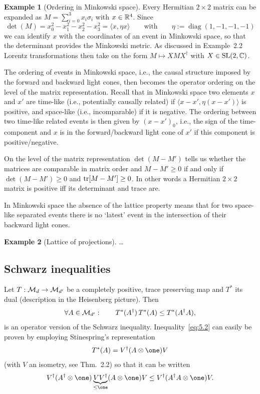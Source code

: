 \documentclass[11pt,a4paper]{article}
\theoremstyle{plain}
\theoremstyle{definition}
\newtheorem{example}{Example}[section]
\theoremstyle{remark}
\numberwithin{equation}{section}
\begin{document}
\begin{example}[Ordering in Minkowski space]
    Every Hermitian $2\times 2$ matrix can be expanded as
    $M=\sum_{i=0}^3 x_i\sigma_i$ with $x\in \mathbb{R}^4$.
    Since
    \[
        \det(M) = x_0^2-x_1^2-x_2^2-x_3^2 = \langle x, \eta x\rangle
        \qquad\text{with}\qquad \eta := \operatorname{diag}(1,-1,-1,-1)
    \]
    we can identify $x$ with the coordinates of an event in Minkowski space, so that the
    determinant provides the Minkowski metric. As discussed in Example~2.2 Lorentz
    transformations then take on the form $M \mapsto XMX^\dagger$ with
    $X\in \mathrm{SL}(2,\mathbb{C})$.

    The ordering of events in Minkowski space, i.e., the causal structure imposed by the
    forward and backward light cones, then becomes the operator ordering on the level of
    the matrix representation. Recall that in Minkowski space two elements $x$ and $x'$
    are time-like (i.e., potentially causally related) if
    $\langle x-x', \eta(x-x')\rangle$ is positive, and space-like (i.e., incomparable) if it
    is negative. The ordering between two time-like related events is then given by
    $(x-x')_0$, i.e., the sign of the time-component and $x$ is in the forward/backward
    light cone of $x'$ if this component is positive/negative.

    On the level of the matrix representation $\det(M-M')$ tells us whether the matrices
    are comparable in matrix order and $M-M' \ge 0$ if and only if $\det(M-M')\ge 0$
    and $\operatorname{tr}[M-M']\ge 0$. In other words a Hermitian $2\times 2$ matrix is positive iff
    its determinant and trace are.

    In Minkowski space the absence of the lattice property means that for two space-like
    separated events there is no `latest' event in the intersection of their backward light
    cones.
\end{example}

\begin{example}[Lattice of projections]
    \dots
\end{example}

\subsection{Schwarz inequalities}

Let $T:\mathcal{M}_d \to \mathcal{M}_{d'}$ be a completely positive, trace preserving map and
$T^*$ its dual (description in the Heisenberg picture). Then
\begin{equation}\label{eq:5.2}
    \forall A\in \mathcal{M}_{d'}:\qquad T^*(A^\dagger)\,T^*(A) \le T^*(A^\dagger A),
\end{equation}
is an operator version of the Schwarz inequality. Inequality~\eqref{eq:5.2} can easily
be proven by employing Stinespring's representation
\[
    T^*(A)=V^\dagger(A\otimes \one)V
\]
(with $V$ an isometry, see Thm.~2.2) so that it can be written
\begin{equation}\label{eq:5.3}
    V^\dagger(A^\dagger \otimes \one)
    \underbrace{VV^\dagger}_{\le \one}
    (A\otimes \one)V
    \le
    V^\dagger(A^\dagger A \otimes \one)V.
\end{equation}
\end{document}
